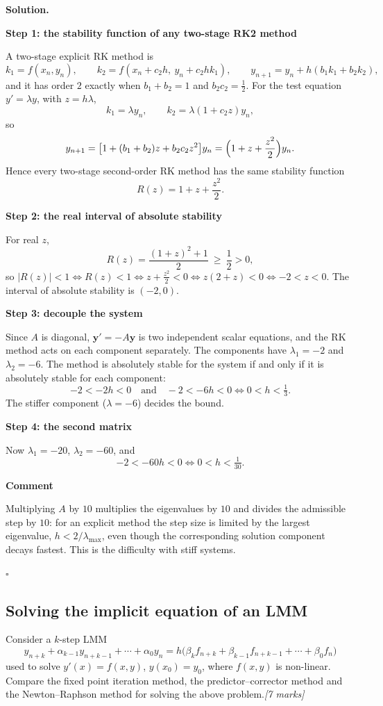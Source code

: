 \documentclass[11pt,a4paper]{article}
\newenvironment{solution}
  {\par\noindent\textbf{Solution.}\par\nobreak}
  {\par\hfill\(\square\)\par}
\newcommand{\step}[1]{\par\addvspace{0.5em}\noindent\textbf{#1}\par\nobreak}
\newcommand{\mk}[1]{\hfill\textit{[#1 marks]}}
\begin{document}
\begin{solution}
\step{Step 1: the stability function of any two-stage RK2 method}
A two-stage explicit RK method is
\[
  k_1=f(x_n,y_n),\qquad
  k_2=f(x_n+c_2h,\ y_n+c_2hk_1),\qquad
  y_{n+1}=y_n+h(b_1k_1+b_2k_2),
\]
and it has order \(2\) exactly when \(b_1+b_2=1\) and \(b_2c_2=\tfrac12\).
For the test equation \(y'=\lambda y\), with \(z=h\lambda\),
\[
  k_1=\lambda y_n,\qquad k_2=\lambda(1+c_2z)y_n,
\]
so
\[
  y_{n+1}=\bigl[1+(b_1+b_2)z+b_2c_2z^2\bigr]y_n
         =\Bigl(1+z+\frac{z^2}2\Bigr)y_n .
\]
Hence every two-stage second-order RK method has the same stability
function
\[
  R(z)=1+z+\frac{z^2}{2}.
\]

\step{Step 2: the real interval of absolute stability}
For real \(z\),
\[
  R(z)=\frac{(1+z)^2+1}{2}\ \ge\ \frac12>0,
\]
so \(|R(z)|<1\iff R(z)<1\iff z+\frac{z^2}2<0\iff z(2+z)<0\iff -2<z<0\).
The interval of absolute stability is \((-2,0)\).

\step{Step 3: decouple the system}
Since \(A\) is diagonal, \(\mathbf y'=-A\mathbf y\) is two independent
scalar equations, and the RK method acts on each component separately.
The components have \(\lambda_1=-2\) and \(\lambda_2=-6\).  The method is
absolutely stable for the system if and only if it is absolutely stable
for each component:
\[
  -2<-2h<0\quad\text{and}\quad -2<-6h<0
  \iff 0<h<\tfrac13 .
\]
The stiffer component (\(\lambda=-6\)) decides the bound.

\step{Step 4: the second matrix}
Now \(\lambda_1=-20\), \(\lambda_2=-60\), and
\[
  -2<-60h<0\iff 0<h<\tfrac1{30}.
\]

\step{Comment}
Multiplying \(A\) by \(10\) multiplies the eigenvalues by \(10\) and
divides the admissible step by \(10\): for an explicit method the step
size is limited by the largest eigenvalue, \(h<2/\lambda_{\max}\), even
though the corresponding solution component decays fastest.  This is
the difficulty with stiff systems.
\end{solution}

\subsection{Solving the implicit equation of an LMM}

\begin{qbox}
Consider a \(k\)-step LMM
\[
  y_{n+k}+\alpha_{k-1}y_{n+k-1}+\cdots+\alpha_0y_n
  =h\bigl(\beta_kf_{n+k}+\beta_{k-1}f_{n+k-1}+\cdots+\beta_0f_n\bigr)
\]
used to solve \(y'(x)=f(x,y)\), \(y(x_0)=y_0\), where \(f(x,y)\) is
non-linear.  Compare the fixed point iteration method, the
predictor--corrector method and the Newton--Raphson method for solving
the above problem.\mk{7}
\end{qbox}
\end{document}
